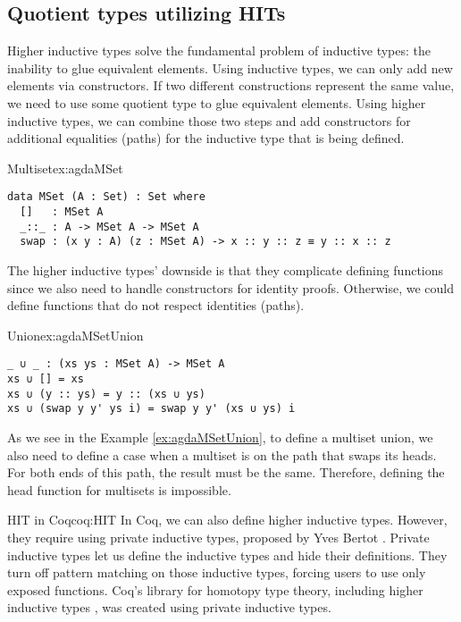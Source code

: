 \subsection{Quotient types utilizing HITs}
Higher inductive types solve the fundamental problem of inductive types: the inability to glue equivalent elements. Using inductive types, we can only add new elements via constructors. If two different constructions represent the same value, we need to use some quotient type to glue equivalent elements. Using higher inductive types, we can combine those two steps and add constructors for additional equalities (paths) for the inductive type that is being defined.
\begin{example}{Multiset}{ex:agdaMSet}
\begin{verbatim}
data MSet (A : Set) : Set where
  []   : MSet A
  _::_ : A -> MSet A -> MSet A 
  swap : (x y : A) (z : MSet A) -> x :: y :: z ≡ y :: x :: z
\end{verbatim}
\end{example}
The higher inductive types' downside is that they complicate defining functions since we also need to handle constructors for identity proofs. Otherwise, we could define functions that do not respect identities (paths).
\begin{example}{Union}{ex:agdaMSetUnion}
\begin{verbatim}
_ ∪ _ : (xs ys : MSet A) -> MSet A
xs ∪ [] = xs
xs ∪ (y :: ys) = y :: (xs ∪ ys)
xs ∪ (swap y y' ys i) = swap y y' (xs ∪ ys) i
\end{verbatim}
\end{example}
As we see in the Example \ref{ex:agdaMSetUnion}, to define a multiset union, we also need to define a case when a multiset is on the path that swaps its heads. For both ends of this path, the result must be the same. Therefore, defining the head function for multisets is impossible.
\begin{coq}{HIT in Coq}{coq:HIT}
In Coq, we can also define higher inductive types. However, they require using private inductive types, proposed by Yves Bertot \cite{PrivetInductive}. Private inductive types let us define the inductive types and hide their definitions. They turn off pattern matching on those inductive types, forcing users to use only exposed functions. Coq's library for homotopy type theory, including higher inductive types \cite{HoTTinCoq}, was created using private inductive types.
\end{coq}